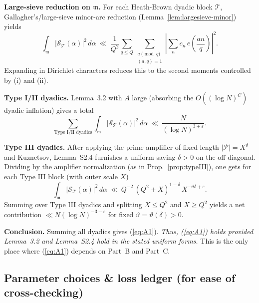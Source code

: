 \documentclass[11pt]{article}
\def\eqref#1{(\ref{#1})}%
\theoremstyle{definition}
\theoremstyle{remark}
\numberwithin{equation}{part}
\begin{document}
\medskip
\noindent\textbf{Large-sieve reduction on $\mathfrak m$.} For each Heath-Brown dyadic block $\mathcal T$, Gallagher’s/large-sieve minor-arc reduction (Lemma~\ref{lem:largesieve-minor}) yields
\[
	\int_{\mathfrak m}\big|\mathcal S_{\mathcal T}(\alpha)\big|^2\,d\alpha
	\ \ll\ \frac{1}{Q^2}\sum_{q\le Q}\sum_{\substack{a\!\!\!\pmod q\\(a,q)=1}}
	\left|\sum_n c_n\,e\!\left(\frac{an}{q}\right)\right|^2.
\]
Expanding in Dirichlet characters reduces this to the second moments controlled by (i) and (ii).

\medskip
\noindent\textbf{Type I/II dyadics.} Lemma~3.2 with $A$ large (absorbing the $O((\log N)^C)$ dyadic inflation) gives a total
\[
	\sum_{\text{Type I/II dyadics}}
	\int_{\mathfrak m}\big|\mathcal S_{\mathcal T}(\alpha)\big|^2\,d\alpha
	\ \ll\ \frac{N}{(\log N)^{3+\varepsilon}}.
\]

\medskip
\noindent\textbf{Type III dyadics.} After applying the prime amplifier of fixed length $|\mathcal P|=X^\vartheta$ and Kuznetsov, Lemma~S2.4 furnishes a uniform saving $\delta>0$ on the off-diagonal. Dividing by the amplifier normalization (as in Prop.~\ref{prop:typeIII}), one gets for each Type III block (with outer scale $X$)
\[
	\int_{\mathfrak m}\big|\mathcal S_{\mathcal T}(\alpha)\big|^2\,d\alpha
	\ \ll\ Q^{-2}\,(Q^2+X)^{1-\delta}\,X^{-\vartheta\delta+\varepsilon}.
\]
Summing over Type III dyadics and splitting $X\le Q^2$ and $X\ge Q^2$ yields a net contribution $\ll N(\log N)^{-3-\varepsilon}$ for fixed $\vartheta=\vartheta(\delta)>0$.

\medskip
\noindent\textbf{Conclusion.} Summing all dyadics gives \eqref{eq:A1}. \emph{Thus, \eqref{eq:A1} holds provided Lemma~3.2 and Lemma~S2.4 hold in the stated uniform forms.} This is the only place where \eqref{eq:A1} depends on Part~B and Part~C.

\subsection{Parameter choices \& loss ledger (for ease of cross-checking)}
\end{document}

